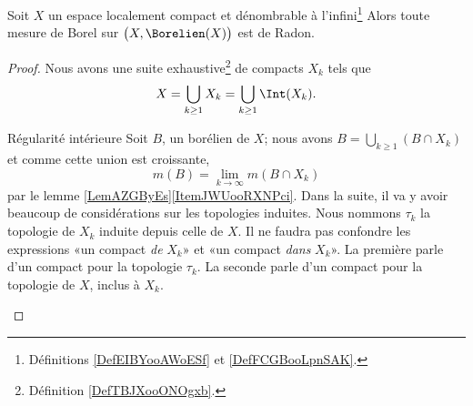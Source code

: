 \begin{proposition}     \label{PropNCASooBnbFrc}
    Soit \( X\) un espace localement compact et dénombrable à l'infini\footnote{Définitions \ref{DefEIBYooAWoESf} et \ref{DefFCGBooLpnSAK}.} Alors toute mesure de Borel sur \( \big( X,\Borelien(X) \big)\) est de Radon.
\end{proposition}

\begin{proof}
    Nous avons une suite exhaustive\footnote{Définition \ref{DefTBJXooONOgxb}.} de compacts \( X_k\) tels que
    \begin{equation}
        X=\bigcup_{k\geq 1}X_k=\bigcup_{k\geq 1}\Int(X_k).
    \end{equation}
    \begin{subproof}
    \item[Régularité intérieure]
    Soit \( B\), un borélien de \( X\); nous avons \( B=\bigcup_{k\geq 1}(B\cap X_k)\) et comme cette union est croissante,
    \begin{equation}
        m(B)=\lim_{k\to \infty} m(B\cap X_k)
    \end{equation}
    par le lemme \ref{LemAZGByEs}\ref{ItemJWUooRXNPci}. Dans la suite, il va y avoir beaucoup de considérations sur les topologies induites. Nous nommons \( \tau_k\) la topologie de \( X_k\) induite depuis celle de \( X\). Il ne faudra pas confondre les expressions «un compact \emph{de} $X_k$»  et «un compact \emph{dans} \( X_k\)». La première parle d'un compact pour la topologie \( \tau_k\). La seconde parle d'un compact pour la topologie de \( X\), inclus à \( X_k\).
    

\end{subproof}
\end{proof}
